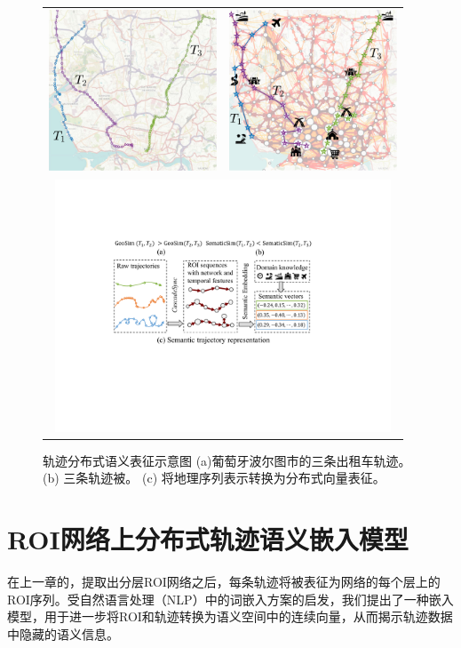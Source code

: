 \tabcolsep=0.5pt
\begin{figure}[!htb]
\centering
\begin{tabular}{cc}
\includegraphics[width=50mm]{pics/introduction1.pdf} & \includegraphics[width=50mm]{pics/introduction2_w.pdf}\\
\multicolumn{2}{c}{\includegraphics[width=100mm]{pics/introduction.pdf}}
\end{tabular}
\caption {轨迹分布式语义表征示意图 (a)葡萄牙波尔图市的三条出租车轨迹。 (b) 三条轨迹被。 (c) 将地理序列表示转换为分布式向量表征。}
\label{fig:introduction}
\end{figure}


\section{ROI网络上分布式轨迹语义嵌入模型}
在上一章的，提取出分层ROI网络之后，每条轨迹将被表征为网络的每个层上的ROI序列。受自然语言处理（NLP）中的词嵌入方案的启发，我们提出了一种嵌入模型，用于进一步将ROI和轨迹转换为语义空间中的连续向量，从而揭示轨迹数据中隐藏的语义信息。

